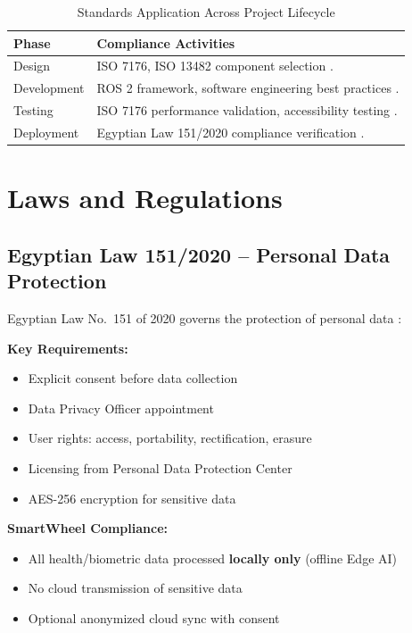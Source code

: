 \documentclass[12pt,a4paper]{report}
\begin{document}
\begin{table}[H]
\centering
\caption{Standards Application Across Project Lifecycle}
\label{tab:standards_integration}
\begin{tabularx}{\textwidth}{@{}p{3cm}X@{}}
\toprule
\textbf{Phase} & \textbf{Compliance Activities} \\
\midrule
Design      & ISO 7176, ISO 13482 component selection \cite{iso7176_4,iso13482}. \\
Development & ROS 2 framework, software engineering best practices \cite{ros2,acm_ieee_code}. \\
Testing     & ISO 7176 performance validation, accessibility testing \cite{iso7176_6}. \\
Deployment  & Egyptian Law 151/2020 compliance verification \cite{egypt_law_151}. \\
\bottomrule
\end{tabularx}
\end{table}

\section{Laws and Regulations}

\subsection{Egyptian Law 151/2020 -- Personal Data Protection}

Egyptian Law No.\ 151 of 2020 governs the protection of personal data \cite{egypt_law_151}:

\textbf{Key Requirements:}
\begin{itemize}
    \item Explicit consent before data collection
    \item Data Privacy Officer appointment
    \item User rights: access, portability, rectification, erasure
    \item Licensing from Personal Data Protection Center
    \item AES-256 encryption for sensitive data
\end{itemize}

\textbf{SmartWheel Compliance:}
\begin{itemize}
    \item All health/biometric data processed \textbf{locally only} (offline Edge AI)
    \item No cloud transmission of sensitive data
    \item Optional anonymized cloud sync with consent
\end{itemize}
\end{document}
